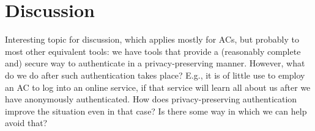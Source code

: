 \section{Discussion}
\label{sec:discussion}


Interesting topic for discussion, which applies mostly for ACs, but probably
to most other equivalent tools: we have tools that provide a (reasonably
complete and) secure way to authenticate in a privacy-preserving manner.
However, what do we do after such authentication takes place? E.g., it is of
little use to employ an AC to log into an online service, if that service
will learn all about us after we have anonymously authenticated. How does
privacy-preserving authentication improve the situation even in that case?
Is there some way in which we can help avoid that?

